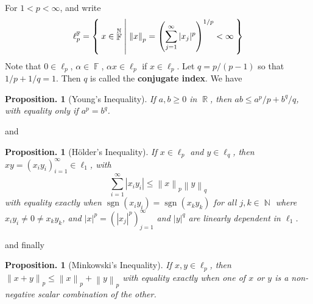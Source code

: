 \documentclass[11pt, a4paper]{memoir}
\DeclareMathOperator{\N}{{\mathbb{N}}}
\DeclareMathOperator{\R}{{\mathbb{R}}}
\DeclareMathOperator{\F}{{\mathbb{F}}}
\newcommand{\norm}[1]{\ensuremath{\left\lVert#1\right\rVert}}
\newcommand{\abs}[1]{\ensuremath{\left\lvert#1\right\rvert}}
\theoremstyle{change}
\newtheorem{proposition}[theorem]{Proposition.}
\theoremstyle{plain}
\theoremstyle{nonumberplain}
\DeclareMathOperator{\sgn}{sgn}
\numberwithin{equation}{section}
\begin{document}
For $1<p<\infty$, and write
\begin{equation*}
    \ell_p^{\F}=\Set{x\in\F^{\N} |\norm{x}_p=\left(\sum_{j=1}^\infty|x_j|^p\right)^{1/p}<\infty}
\end{equation*}
Note that $0\in\ell_p$, $\alpha\in\F$, $\alpha x\in\ell_p$ if $x\in\ell_p$.
Let $q=p/(p-1)$ so that $1/p+1/q=1$.
Then $q$ is called the \textbf{conjugate index}.
We have
\begin{proposition}[Young's Inequality]
    If $a,b\geq 0$ in $\R$, then $ab\leq a^p/p+b^q/q$, with equality only if $a^p=b^q$.
\end{proposition}
and
\begin{proposition}[H\"older's Inequality]
    If $x\in\ell_p$ and $y\in\ell_q$, then $xy=(x_iy_i)_{i=1}^\infty\in\ell_1$, with
    \begin{equation*}
        \sum_{i=1}^\infty \abs{x_iy_i}\leq\norm{x}_p\norm{y}_q
    \end{equation*}
    with equality exactly when $\sgn(x_iy_i)=\sgn(x_ky_k)$ for all $j,k\in\N$ where $x_iy_i\neq 0\neq x_ky_k$, and $|x|^p=(|x_j|^p)_{j=1}^\infty$ and $|y|^q$ are linearly dependent in $\ell_1$.
\end{proposition}
and finally
\begin{proposition}[Minkowski's Inequality]
    If $x,y\in\ell_p$, then $\norm{x+y}_p\leq\norm{x}_p+\norm{y}_p$ with equality exactly when one of $x$ or $y$ is a non-negative scalar combination of the other.
\end{proposition}
\end{document}
